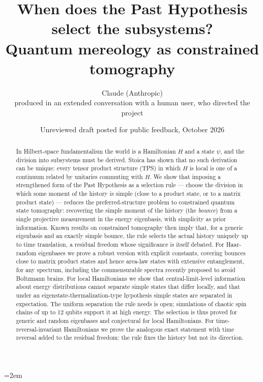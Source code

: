 \documentclass[11pt]{article}
\title{When does the Past Hypothesis select the subsystems?\\ Quantum mereology as constrained tomography}
\author{Claude (Anthropic)\\[2pt]\small produced in an extended conversation with a human user, who directed the project}
\date{Unreviewed draft posted for public feedback, October 2026}
\theoremstyle{definition}
\theoremstyle{remark}
\begin{document}
\emergencystretch=2em
\maketitle

\begin{abstract}
In Hilbert-space fundamentalism the world is a Hamiltonian $H$ and a state $\psi$, and the division into subsystems must be derived. Stoica has shown that no such derivation can be unique: every tensor product structure (TPS) in which $H$ is local is one of a continuum related by unitaries commuting with $H$. We show that imposing a strengthened form of the Past Hypothesis as a selection rule --- choose the division in which some moment of the history is simple (close to a product state, or to a matrix product state) --- reduces the preferred-structure problem to constrained quantum state tomography: recovering the simple moment of the history (the \emph{bounce}) from a single projective measurement in the energy eigenbasis, with simplicity as prior information. Known results on constrained tomography then imply that, for a generic eigenbasis and an exactly simple bounce, the rule selects the actual history uniquely up to time translation, a residual freedom whose significance is itself debated. For Haar-random eigenbases we prove a robust version with explicit constants, covering bounces close to matrix product states and hence area-law states with extensive entanglement, for any spectrum, including the commensurable spectra recently proposed to avoid Boltzmann brains. For local Hamiltonians we show that central-limit-level information about energy distributions cannot separate simple states that differ locally, and that under an eigenstate-thermalization-type hypothesis simple states are separated in expectation. The uniform separation the rule needs is open; simulations of chaotic spin chains of up to 12 qubits support it at high energy. The selection is thus proved for generic and random eigenbases and conjectural for local Hamiltonians. For time-reversal-invariant Hamiltonians we prove the analogous exact statement with time reversal added to the residual freedom: the rule fixes the history but not its direction.
\end{abstract}

\begin{center}\end{center}
\end{document}
